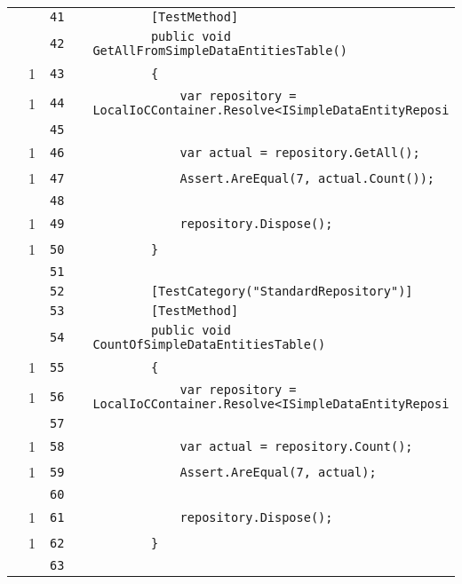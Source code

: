 \documentclass[a4paper,10pt]{article}
\begin{document}
\begin{longtable}[l]{lrrll}
\cellcolor{gray} &  & \verb~41~ & & \verb~        [TestMethod]~\\
\cellcolor{gray} &  & \verb~42~ & & \verb~        public void GetAllFromSimpleDataEntitiesTable()~\\
\cellcolor{green} & 1 & \verb~43~ & & \verb~        {~\\
\cellcolor{green} & 1 & \verb~44~ & & \verb~            var repository = LocalIoCContainer.Resolve<ISimpleDataEntityReposi~\\
\cellcolor{gray} &  & \verb~45~ & & \verb~~\\
\cellcolor{green} & 1 & \verb~46~ & & \verb~            var actual = repository.GetAll();~\\
\cellcolor{green} & 1 & \verb~47~ & & \verb~            Assert.AreEqual(7, actual.Count());~\\
\cellcolor{gray} &  & \verb~48~ & & \verb~~\\
\cellcolor{green} & 1 & \verb~49~ & & \verb~            repository.Dispose();~\\
\cellcolor{green} & 1 & \verb~50~ & & \verb~        }~\\
\cellcolor{gray} &  & \verb~51~ & & \verb~~\\
\cellcolor{gray} &  & \verb~52~ & & \verb~        [TestCategory("StandardRepository")]~\\
\cellcolor{gray} &  & \verb~53~ & & \verb~        [TestMethod]~\\
\cellcolor{gray} &  & \verb~54~ & & \verb~        public void CountOfSimpleDataEntitiesTable()~\\
\cellcolor{green} & 1 & \verb~55~ & & \verb~        {~\\
\cellcolor{green} & 1 & \verb~56~ & & \verb~            var repository = LocalIoCContainer.Resolve<ISimpleDataEntityReposi~\\
\cellcolor{gray} &  & \verb~57~ & & \verb~~\\
\cellcolor{green} & 1 & \verb~58~ & & \verb~            var actual = repository.Count();~\\
\cellcolor{green} & 1 & \verb~59~ & & \verb~            Assert.AreEqual(7, actual);~\\
\cellcolor{gray} &  & \verb~60~ & & \verb~~\\
\cellcolor{green} & 1 & \verb~61~ & & \verb~            repository.Dispose();~\\
\cellcolor{green} & 1 & \verb~62~ & & \verb~        }~\\
\cellcolor{gray} &  & \verb~63~ & & \verb~~\\

\end{longtable}
\end{document}
